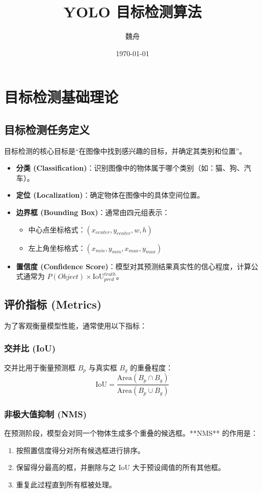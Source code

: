 \documentclass[11pt,a4paper]{article}
\title{YOLO 目标检测算法}
\author{魏舟}
\date{\today}
\begin{document}
\maketitle

\tableofcontents
\newpage


\section{目标检测基础理论}

\subsection{目标检测任务定义}
目标检测的核心目标是“在图像中找到感兴趣的目标，并确定其类别和位置”。
\begin{itemize}
    \item \textbf{分类 (Classification)}：识别图像中的物体属于哪个类别（如：猫、狗、汽车）。
    \item \textbf{定位 (Localization)}：确定物体在图像中的具体空间位置。
    \item \textbf{边界框 (Bounding Box)}：通常由四元组表示：
    \begin{itemize}
        \item 中心点坐标格式：$(x_{center}, y_{center}, w, h)$
        \item 左上角坐标格式：$(x_{min}, y_{min}, x_{max}, y_{max})$
    \end{itemize}
    \item \textbf{置信度 (Confidence Score)}：模型对其预测结果真实性的信心程度，计算公式通常为 $P(Object) \times \text{IoU}_{pred}^{truth}$。
\end{itemize}

\subsection{评价指标 (Metrics)}
为了客观衡量模型性能，通常使用以下指标：

\subsubsection{交并比 (IoU)}
交并比用于衡量预测框 $B_p$ 与真实框 $B_g$ 的重叠程度：
$$ \text{IoU} = \frac{\text{Area}(B_p \cap B_g)}{\text{Area}(B_p \cup B_g)} $$



\subsubsection{非极大值抑制 (NMS)}
在预测阶段，模型会对同一个物体生成多个重叠的候选框。**NMS** 的作用是：
\begin{enumerate}
    \item 按照置信度得分对所有候选框进行排序。
    \item 保留得分最高的框，并删除与之 IoU 大于预设阈值的所有其他框。
    \item 重复此过程直到所有框被处理。
\end{enumerate}
\end{document}
